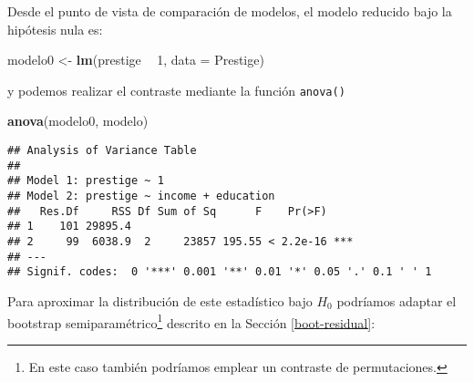 \documentclass[
]{book}
\newenvironment{Shaded}{\begin{snugshade}}{\end{snugshade}}
\newcommand{\DataTypeTok}[1]{\textcolor[rgb]{0.13,0.29,0.53}{#1}}
\newcommand{\DecValTok}[1]{\textcolor[rgb]{0.00,0.00,0.81}{#1}}
\newcommand{\KeywordTok}[1]{\textcolor[rgb]{0.13,0.29,0.53}{\textbf{#1}}}
\newcommand{\NormalTok}[1]{#1}
\newcommand{\OperatorTok}[1]{\textcolor[rgb]{0.81,0.36,0.00}{\textbf{#1}}}
\newcommand{\StringTok}[1]{\textcolor[rgb]{0.31,0.60,0.02}{#1}}
\theoremstyle{break}
\theoremstyle{definition}
\theoremstyle{definition}
\theoremstyle{definition}
\theoremstyle{remark}
\begin{document}
Desde el punto de vista de comparación de modelos, el modelo
reducido bajo la hipótesis nula es:

\begin{Shaded}
\begin{Highlighting}[]
\NormalTok{modelo0 <-}\StringTok{ }\KeywordTok{lm}\NormalTok{(prestige }\OperatorTok{~}\StringTok{ }\DecValTok{1}\NormalTok{, }\DataTypeTok{data =}\NormalTok{ Prestige)}
\end{Highlighting}
\end{Shaded}

y podemos realizar el contraste mediante la función \texttt{anova()}

\begin{Shaded}
\begin{Highlighting}[]
\KeywordTok{anova}\NormalTok{(modelo0, modelo)}
\end{Highlighting}
\end{Shaded}

\begin{verbatim}
## Analysis of Variance Table
## 
## Model 1: prestige ~ 1
## Model 2: prestige ~ income + education
##   Res.Df     RSS Df Sum of Sq      F    Pr(>F)    
## 1    101 29895.4                                  
## 2     99  6038.9  2     23857 195.55 < 2.2e-16 ***
## ---
## Signif. codes:  0 '***' 0.001 '**' 0.01 '*' 0.05 '.' 0.1 ' ' 1
\end{verbatim}

Para aproximar la distribución de este estadístico bajo \(H_0\) podríamos adaptar
el bootstrap semiparamétrico\footnote{En este caso también podríamos emplear un contraste
  de permutaciones.} descrito en la Sección \ref{boot-residual}:
\end{document}
